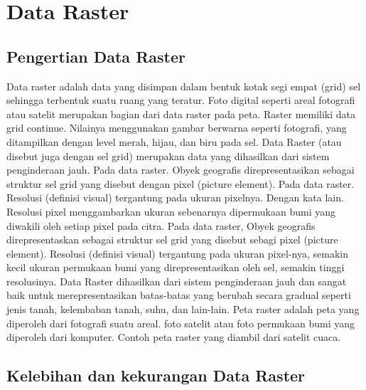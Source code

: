 
\section{Data Raster}
\subsection{Pengertian Data Raster}
Data raster adalah data yang disimpan dalam bentuk kotak segi empat (grid) sel sehingga terbentuk suatu ruang yang 
teratur. Foto digital seperti areal fotografi atau satelit merupakan bagian dari data raster pada peta. 
Raster memiliki data grid continue. Nilainya menggunakan gambar berwarna seperti fotografi, yang ditampilkan dengan 
level merah, hijau, dan biru pada sel. Data Raster (atau disebut juga dengan sel grid) merupakan data yang 
dihasilkan dari sistem penginderaan jauh. Pada data raster. Obyek geografis direpresentasikan sebagai struktur
sel grid yang disebut dengan pixel (picture element). Pada data raster. Resolusi (definisi visual) tergantung
pada ukuran pixelnya. Dengan kata lain. Resolusi pixel menggambarkan ukuran sebenarnya dipermukaan bumi 
yang diwakili oleh setiap pixel pada citra. Pada data raster, Obyek geografis direpresentaskan sebagai struktur sel grid yang disebut sebagi pixel (picture element). Resolusi (definisi visual) tergantung pada ukuran pixel-nya, semakin kecil ukuran permukaan bumi yang direpresentasikan oleh sel, semakin tinggi resolusinya. Data Raster dihasilkan dari sistem penginderaan jauh dan sangat baik untuk merepresentasikan batas-batas yang berubah secara gradual seperti jenis tanah, kelembaban tanah, suhu, dan lain-lain. Peta raster adalah peta yang diperoleh dari fotografi suatu areal. foto satelit atau foto permukaan bumi yang diperoleh dari komputer. Contoh peta raster yang diambil dari satelit cuaca.\cite{puntodewo2003sistem}

\subsection{Kelebihan dan kekurangan Data Raster}
